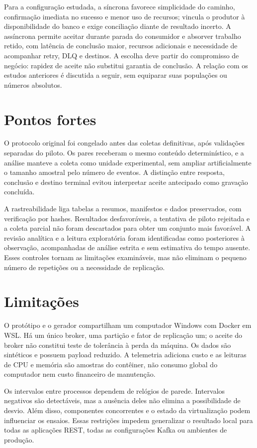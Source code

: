 Para a configuração estudada, a síncrona favorece simplicidade do caminho, confirmação imediata no sucesso e menor uso de recursos; vincula o produtor à disponibilidade do banco e exige conciliação diante de resultado incerto. A assíncrona permite aceitar durante parada do consumidor e absorver trabalho retido, com latência de conclusão maior, recursos adicionais e necessidade de acompanhar retry, DLQ e destinos. A escolha deve partir do compromisso de negócio: rapidez de aceite não substitui garantia de conclusão. A relação com os estudos anteriores é discutida a seguir, sem equiparar suas populações ou números absolutos.



\section{Pontos fortes}
O protocolo original foi congelado antes das coletas definitivas, após validações separadas do piloto. Os pares receberam o mesmo conteúdo determinístico, e a análise manteve a coleta como unidade experimental, sem ampliar artificialmente o tamanho amostral pelo número de eventos. A distinção entre resposta, conclusão e destino terminal evitou interpretar aceite antecipado como gravação concluída.

A rastreabilidade liga tabelas a resumos, manifestos e dados preservados, com verificação por hashes. Resultados desfavoráveis, a tentativa de piloto rejeitada e a coleta parcial não foram descartados para obter um conjunto mais favorável. A revisão analítica e a leitura exploratória foram identificadas como posteriores à observação, acompanhadas de análise estrita e sem estimativa do tempo ausente. Esses controles tornam as limitações examináveis, mas não eliminam o pequeno número de repetições ou a necessidade de replicação.

\section{Limitações}
O protótipo e o gerador compartilham um computador Windows com Docker em WSL. Há um único broker, uma partição e fator de replicação um; o aceite do broker não constitui teste de tolerância à perda da máquina. Os dados são sintéticos e possuem payload reduzido. A telemetria adiciona custo e as leituras de CPU e memória são amostras do contêiner, não consumo global do computador nem custo financeiro de manutenção.

Os intervalos entre processos dependem de relógios de parede. Intervalos negativos são detectáveis, mas a ausência deles não elimina a possibilidade de desvio. Além disso, componentes concorrentes e o estado da virtualização podem influenciar os ensaios. Essas restrições impedem generalizar o resultado local para todas as aplicações REST, todas as configurações Kafka ou ambientes de produção.


